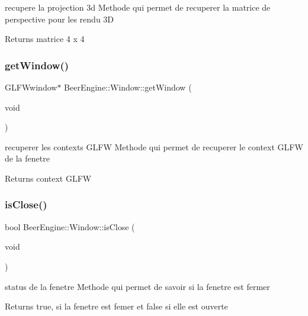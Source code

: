 recupere la projection 3d Methode qui permet de recuperer la matrice de perspective pour les rendu 3D 

\begin{DoxyReturn}{Returns}
matrice 4 x 4 
\end{DoxyReturn}
\mbox{\label{class_beer_engine_1_1_window_af7a6662e99bb0d07787014adacb8db33}} 
\subsubsection{\texorpdfstring{get\+Window()}{getWindow()}}
{\footnotesize\ttfamily G\+L\+F\+Wwindow$\ast$ Beer\+Engine\+::\+Window\+::get\+Window (\begin{DoxyParamCaption}\item[{void}]{ }\end{DoxyParamCaption})}



recuperer les contexts G\+L\+FW Methode qui permet de recuperer le context G\+L\+FW de la fenetre 

\begin{DoxyReturn}{Returns}
context G\+L\+FW 
\end{DoxyReturn}
\mbox{\label{class_beer_engine_1_1_window_a5b29d76b11e9f7457a92e6465939b71d}} 
\subsubsection{\texorpdfstring{is\+Close()}{isClose()}}
{\footnotesize\ttfamily bool Beer\+Engine\+::\+Window\+::is\+Close (\begin{DoxyParamCaption}\item[{void}]{ }\end{DoxyParamCaption})}



status de la fenetre Methode qui permet de savoir si la fenetre est fermer 

\begin{DoxyReturn}{Returns}
true, si la fenetre est femer et false si elle est ouverte 
\end{DoxyReturn}
\mbox{\label{class_beer_engine_1_1_window_a3b2c31a149ed0b90ac292d88f87fd369}} 
